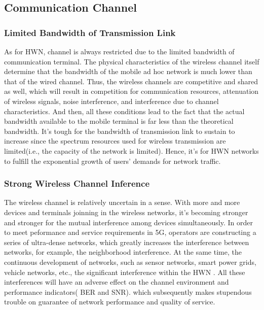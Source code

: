 \documentclass[journal,comsoc]{IEEEtran}
\begin{document}
		\subsection{Communication Channel}
			\subsubsection{Limited Bandwidth of Transmission Link}
				As for HWN, channel is always restricted due to the limited bandwidth of communication terminal.
				The physical characteristics of the wireless channel itself determine that the bandwidth of the mobile ad hoc network 
				is much lower than that of the wired channel. 
				Thus, the wireless channels are competitive and shared as well, which will result in competition for communication resources, 
				attenuation of wireless signals, noise interference, and interference due to channel characteristics.
				And then, all these conditions lead to the fact that the actual bandwidth available to the mobile terminal is far less than the theoretical bandwidth.
				It's tough for the bandwidth of transmission link to sustain to increase since the spectrum resources used for wireless transmission are limited(i.e., the capacity of the network is limited).
				Hence, it's  for HWN networks to fulfill the exponential growth of users' demands for network traffic.
			
			\subsubsection{Strong Wireless Channel Inference}
				The wireless channel is relatively uncertain in a sense.
				With more and more devices and terminals joinning in the wireless networks, it's becoming stronger and stronger for the mutual interference among devices simultaneously.
				In order to meet peformance and service requirements in 5G, operators are constructing a series of ultra-dense networks, 
				which greatly increases the interference between networks, for example, the neighborhood interference.
				At the same time, the continuous development of networks, such as sensor networks, smart power grids, vehicle networks, etc., 
				the significant interference within the HWN . 
				All these interferences will have an adverse effect on the channel environment and performance indicators( BER and SNR). 
				which subsequently makes stupendous trouble on guarantee of network performance and quality of service.
			
\end{document}
